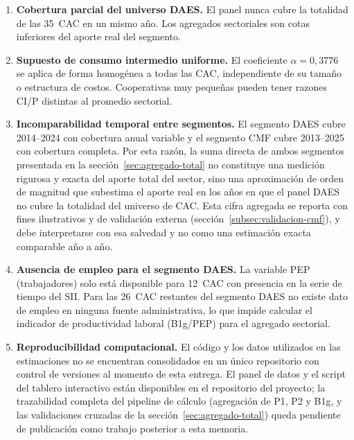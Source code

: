 \begin{enumerate}

  \item \textbf{Cobertura parcial del universo DAES.}
  El panel nunca cubre la totalidad de las 35~CAC en un
  mismo año. Los agregados sectoriales son cotas inferiores
  del aporte real del segmento.

  \item \textbf{Supuesto de consumo intermedio uniforme.}
  El coeficiente $\alpha = 0{,}3776$ se aplica de forma
  homogénea a todas las CAC, independiente de su tamaño o
  estructura de costos. Cooperativas muy pequeñas pueden
  tener razones CI/P distintas al promedio sectorial.

  \item \textbf{Incomparabilidad temporal entre segmentos.}
  El segmento DAES cubre 2014--2024 con cobertura anual variable y el 
  segmento CMF cubre 2013--2025 con cobertura completa. Por esta razón, la suma directa de ambos segmentos presentada en la sección~\ref{sec:agregado-total} no constituye una medición rigurosa y exacta del aporte total del sector, sino una aproximación de orden de magnitud que subestima el aporte real en los años en que el panel DAES no cubre la totalidad del universo de CAC. Esta cifra agregada se reporta con fines ilustrativos y de validación externa (sección~\ref{subsec:validacion-cmf}), y debe interpretarse con esa salvedad y no como una estimación exacta comparable año a año.



\item \textbf{Ausencia de empleo para el segmento DAES.}
  La variable PEP (trabajadores) solo está disponible para
  12~CAC con presencia en la serie de tiempo del SII. Para
  las 26~CAC restantes del segmento DAES no existe dato de
  empleo en ninguna fuente administrativa, lo que impide
  calcular el indicador de productividad laboral (B1g/PEP)
  para el agregado sectorial.

  \item \textbf{Reproducibilidad computacional.} El código
  y los datos utilizados en las estimaciones no se
  encuentran consolidados en un único repositorio con
  control de versiones al momento de esta entrega. El panel
  de datos y el script del tablero interactivo están
  disponibles en el repositorio del proyecto; la
  trazabilidad completa del pipeline de cálculo (agregación
  de P1, P2 y B1g, y las validaciones cruzadas de la
  sección~\ref{sec:agregado-total}) queda pendiente de
  publicación como trabajo posterior a esta memoria.

\end{enumerate}